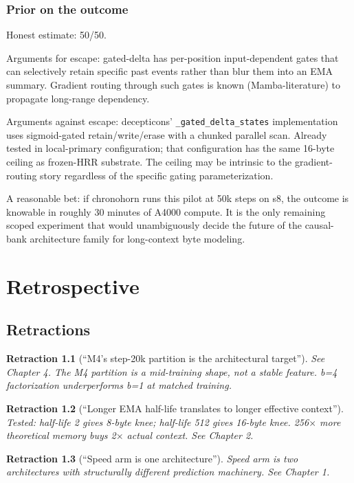 \documentclass[11pt,openany]{book}
\newtheorem{retraction}{Retraction}[chapter]
\begin{document}
\section{Prior on the outcome}

Honest estimate: 50/50.

Arguments for escape: gated-delta has per-position input-dependent gates
that can selectively retain specific past events rather than blur them into
an EMA summary. Gradient routing through such gates is known
(Mamba-literature) to propagate long-range dependency.

Arguments against escape: decepticons' \texttt{\_gated\_delta\_states}
implementation uses sigmoid-gated retain/write/erase with a chunked parallel
scan. Already tested in local-primary configuration; that configuration
has the same 16-byte ceiling as frozen-HRR substrate. The ceiling may be
intrinsic to the gradient-routing story regardless of the specific gating
parameterization.

A reasonable bet: if chronohorn runs this pilot at 50k steps on s8, the
outcome is knowable in roughly 30 minutes of A4000 compute. It is the only
remaining scoped experiment that would unambiguously decide the future of
the causal-bank architecture family for long-context byte modeling.

\part{Retrospective}

\chapter{Retractions}

\begin{retraction}[``M4's step-20k partition is the architectural target'']
See Chapter 4. The M4 partition is a mid-training shape, not a stable
feature. b=4 factorization underperforms b=1 at matched training.
\end{retraction}

\begin{retraction}[``Longer EMA half-life translates to longer effective context'']
Tested: half-life 2 gives 8-byte knee; half-life 512 gives 16-byte knee.
256$\times$ more theoretical memory buys 2$\times$ actual context. See
Chapter 2.
\end{retraction}

\begin{retraction}[``Speed arm is one architecture'']
Speed arm is two architectures with structurally different prediction
machinery. See Chapter 1.
\end{retraction}
\end{document}
